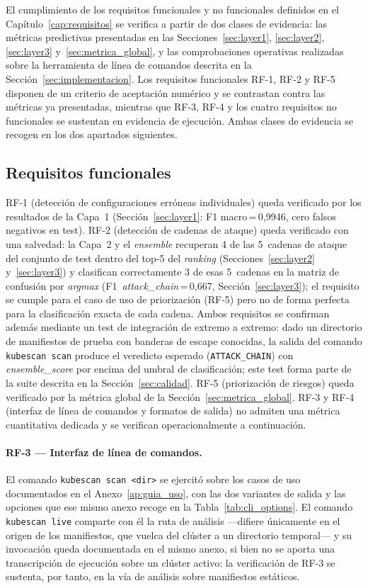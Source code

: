 El cumplimiento de los requisitos funcionales y no funcionales definidos en el
Capítulo~\ref{cap:requisitos} se verifica a partir de dos clases de evidencia: las
métricas predictivas presentadas en las Secciones~\ref{sec:layer1},
\ref{sec:layer2}, \ref{sec:layer3} y~\ref{sec:metrica_global}, y las
comprobaciones operativas realizadas sobre la herramienta de línea de comandos
descrita en la Sección~\ref{sec:implementacion}. Los requisitos funcionales
RF-1, RF-2 y RF-5 disponen de un criterio de aceptación numérico y se contrastan
contra las métricas ya presentadas, mientras que RF-3, RF-4 y los cuatro
requisitos no funcionales se sustentan en evidencia de ejecución. Ambas clases de
evidencia se recogen en los dos apartados siguientes.

\subsection{Requisitos funcionales}

RF-1 (detección de configuraciones erróneas individuales) queda verificado por los
resultados de la Capa~1 (Sección~\ref{sec:layer1}: F1 macro\,=\,0,9946, cero
falsos negativos en test). RF-2 (detección de cadenas de ataque) queda
verificado con una salvedad: la Capa~2 y el \textit{ensemble} recuperan 4 de las
5~cadenas de ataque del conjunto de test dentro del top-5 del \textit{ranking}
(Secciones~\ref{sec:layer2} y~\ref{sec:layer3}) y clasifican correctamente 3 de
esas 5~cadenas en la matriz de confusión por \textit{argmax}
(F1~\textit{attack\_chain}\,=\,0,667, Sección~\ref{sec:layer3}); el
requisito se cumple para el caso de uso de priorización (RF-5) pero no de forma
perfecta para la clasificación exacta de cada cadena. Ambos requisitos se
confirman además mediante un test de integración de extremo a extremo: dado un
directorio de manifiestos de prueba con banderas de escape conocidas, la salida
del comando \texttt{kubescan scan} produce el veredicto esperado
(\texttt{ATTACK\_CHAIN}) con \textit{ensemble\_score} por encima del umbral de
clasificación; este test forma parte de la suite descrita en la
Sección~\ref{sec:calidad}. RF-5 (priorización de riesgos) queda
verificado por la métrica global de la Sección~\ref{sec:metrica_global}. RF-3 y
RF-4 (interfaz de línea de comandos y formatos de salida) no admiten una
métrica cuantitativa dedicada y se verifican operacionalmente a continuación.

\paragraph{RF-3 — Interfaz de línea de comandos.} El comando
\texttt{kubescan scan <dir>} se ejercitó sobre los casos de uso documentados en el
Anexo~\ref{ap:guia_uso}, con las dos variantes de salida y las opciones que ese
mismo anexo recoge en la Tabla~\ref{tab:cli_options}. El comando \texttt{kubescan live} comparte con
él la ruta de análisis —difiere únicamente en el origen de los manifiestos, que
vuelca del clúster a un directorio temporal— y su invocación queda documentada en
el mismo anexo, si bien no se aporta una transcripción de ejecución sobre un
clúster activo: la verificación de RF-3 se sustenta, por tanto, en la vía de
análisis sobre manifiestos estáticos.

